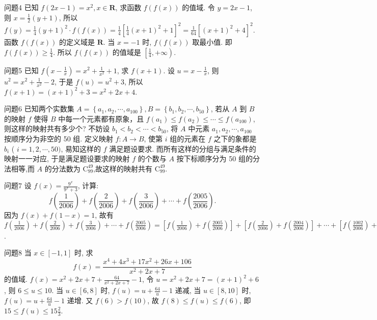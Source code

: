 问题4 已知 $f(2 x-1)=x^2, x \in \mathbf{R}$, 求函数 $f(f(x))$ 的值域.
令 $y=2 x-1$, 则 $x=\frac{1}{2}(y+1)$, 所以 $f(y)=\frac{1}{4}(y+1)^2 \cdot f(f(x))= \frac{1}{4}\left[\frac{1}{4}(x+1)^2+1\right]^2=\frac{1}{64}\left[(x+1)^2+4\right]^2$. 函数 $f(f(x))$ 的定义域是 $\mathbf{R}$. 当 $x=-1$ 时, $f(f(x))$ 取最小值.
即 $f(f(x)) \geqslant \frac{1}{4}$. 所以 $f(f(x))$ 的值域是 $\left[\frac{1}{4},+\infty\right)$.



问题5 已知 $f\left(x-\frac{1}{x}\right)=x^2+\frac{1}{x^2}+1$, 求 $f(x+1)$.
设 $u=x-\frac{1}{x}$, 则 $u^2=x^2+\frac{1}{x^2}-2$, 于是 $f(u)=u^2+3$, 所以 $f(x+ 1) =(x+1)^2+3=x^2+2 x+4$.



问题6 已知两个实数集 $A=\left\{a_1, a_2, \cdots, a_{100}\right\}, B=\left\{b_1, b_2, \cdots, b_{50}\right\}$, 若从 $A$ 到 $B$ 的映射 $f$ 使得 $B$ 中每一个元素都有原象，且 $f\left(a_1\right) \leqslant f\left(a_2\right) \leqslant \cdots \leqslant f\left(a_{100}\right)$, 则这样的映射共有多少个? 
不妨设 $b_1<b_2<\cdots<b_{50}$, 将 $A$ 中元素 $a_1, a_2, \cdots, a_{100}$ 按顺序分为非空的 50 组.
定义映射 $f: A \rightarrow B$, 使第 $i$ 组的元素在 $f$ 之下的象都是 $b_i$ ( $i=1, 2, \cdots, 50)$, 易知这样的 $f$ 满足题设要求.
而所有这样的分组与满足条件的映射一一对应, 于是满足题设要求的映射 $f$ 的个数与 $A$ 按下标顺序分为 50 组的分法相等,而 $A$ 的分法数为 $\mathrm{C}_{99}^{49}$,故这样的映射共有 $\mathrm{C}_{99}^{49}$.



问题7 设 $f(x)=\frac{9^x}{9^x+3}$, 计算:
$$
f\left(\frac{1}{2006}\right)+f\left(\frac{2}{2006}\right)+f\left(\frac{3}{2006}\right)+\cdots+f\left(\frac{2005}{2006}\right) .
$$
因为 $f(x)+f(1-x)=1$, 故有 $f\left(\frac{1}{2006}\right)+f\left(\frac{2}{2006}\right)+f\left(\frac{3}{2006}\right)+\cdots+ f\left(\frac{2005}{2006}\right)=\left[f\left(\frac{1}{2006}\right)+f\left(\frac{2005}{2006}\right)\right]+\left[f\left(\frac{2}{2006}\right)+f\left(\frac{2004}{2006}\right)\right]+\cdots+ \left[f\left(\frac{1002}{2006}\right)+f\left(\frac{1004}{2006}\right)\right]+f\left(\frac{1003}{2006}\right)=1002+f\left(\frac{1}{2}\right)=1002 \frac{1}{2}$.



问题8 当 $x \in[-1,1]$ 时, 求
$$
f(x)=\frac{x^4+4 x^3+17 x^2+26 x+106}{x^2+2 x+7}
$$
的值域.
$f(x)=x^2+2 x+7+\frac{64}{x^2+2 x+7}-1$, 令 $u=x^2+2 x+7=(x+1)^2+6$ , 则 $6 \leqslant u \leqslant 10$. 当 $u \in[6,8]$ 时, $f(u)=u+\frac{64}{u}-1$ 递减, 当 $u \in[8,10]$ 时, $f(u)=u+\frac{64}{u}-1$ 递增.
又 $f(6)>f(10)$, 故 $f(8) \leqslant f(u) \leqslant f(6)$, 即 $15 \leqslant f(u) \leqslant 15 \frac{2}{3}$.



